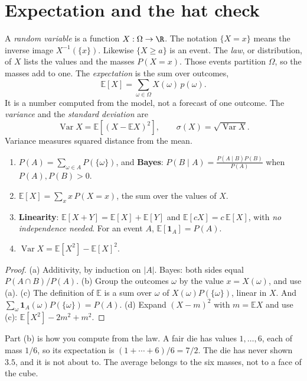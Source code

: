 \section{Expectation and the hat check}

A \emph{random variable} is a function $X:\Omega\to\R$. The notation $\{X=x\}$ means the inverse image $X^{-1}(\{x\})$. Likewise $\{X\ge a\}$ is an event. The \emph{law}, or distribution, of $X$ lists the values and the masses $P(X=x)$. Those events partition $\Omega$, so the masses add to one. The \emph{expectation} is the sum over outcomes,
\[
 \mathbb E[X]=\sum_{\omega\in\Omega}X(\omega)\,p(\omega).
\]
It is a number computed from the model, not a forecast of one outcome. The \emph{variance} and the \emph{standard deviation} are
\[
 \operatorname{Var}X=\mathbb E[(X-\mathbb EX)^2],\qquad
 \sigma(X)=\sqrt{\operatorname{Var}X}.
\]
Variance measures squared distance from the mean.

\begin{proposition}\label{prop:proba}
\begin{enumerate}[label=(\alph*)]
\item $P(A)=\sum_{\omega\in A}P(\{\omega\})$, and \textbf{Bayes}: $P(B\mid A)=\frac{P(A\mid B)P(B)}{P(A)}$ when $P(A),P(B)>0$.
\item $\mathbb E[X]=\sum_xx\,P(X=x)$, the sum over the values of $X$.
\item \textbf{Linearity}: $\mathbb E[X+Y]=\mathbb E[X]+\mathbb E[Y]$ and $\mathbb E[cX]=c\,\mathbb E[X]$, with \emph{no independence needed}. For an event $A$, $\mathbb E[\mathbf 1_A]=P(A)$.
\item $\operatorname{Var}X=\mathbb E[X^2]-\mathbb E[X]^2$.
\end{enumerate}
\end{proposition}
\begin{proof}
(a) Additivity, by induction on $|A|$. Bayes: both sides equal $P(A\cap B)/P(A)$.
(b) Group the outcomes $\omega$ by the value $x=X(\omega)$, and use (a).
(c) The definition of $\mathbb E$ is a sum over $\omega$ of $X(\omega)P(\{\omega\})$, linear in $X$. And $\sum_\omega\mathbf 1_A(\omega)P(\{\omega\})=P(A)$.
(d) Expand $(X-m)^2$ with $m=\mathbb EX$ and use (c): $\mathbb E[X^2]-2m^2+m^2$.
\end{proof}

Part (b) is how you compute from the law. A fair die has values $1,\ldots,6$, each of mass $1/6$, so its expectation is $(1+\cdots+6)/6=7/2$. The die has never shown $3.5$, and it is not about to. The average belongs to the six masses, not to a face of the cube.

